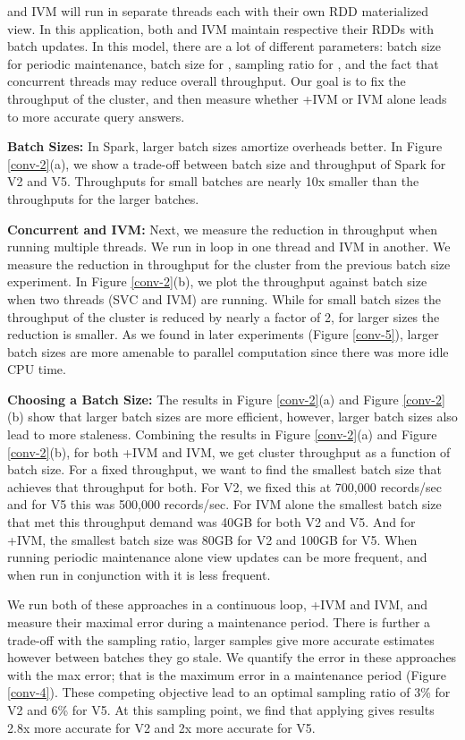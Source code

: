 \svc and IVM will run in separate threads each with their own RDD materialized view.
In this application, both \svc and IVM maintain respective their RDDs with batch updates.
In this model, there are a lot of different parameters: batch size for periodic maintenance, batch size for \svc, sampling ratio for \svc, and the fact that concurrent threads may reduce overall throughput.
Our goal is to fix the throughput of the cluster, and then measure whether \svcnospace+IVM or IVM alone leads to more accurate query answers.

\textbf{Batch Sizes:} In Spark, larger batch sizes amortize overheads better.
In Figure \ref{conv-2}(a), we show a trade-off between batch size and throughput of Spark for V2 and V5.
Throughputs for small batches are nearly 10x smaller than the throughputs for the larger batches. 

\textbf{Concurrent \svc and IVM:} Next, we measure the reduction in throughput when running multiple threads.
We run  in loop in one thread and IVM in another.
We measure the reduction in throughput for the cluster from the previous batch size experiment.
In Figure \ref{conv-2}(b), we plot the throughput against batch size when two threads (SVC and IVM) are running.
While for small batch sizes the throughput of the cluster is reduced by nearly a factor of 2, for larger sizes the reduction is
smaller.
As we found in later experiments (Figure \ref{conv-5}), larger batch sizes are more amenable to parallel computation since there was more idle CPU time.


\textbf{Choosing a Batch Size:}
The results in Figure \ref{conv-2}(a) and Figure \ref{conv-2}(b) show that larger batch sizes are more efficient, however, larger batch sizes also lead to more staleness.
Combining the results in Figure \ref{conv-2}(a) and Figure \ref{conv-2}(b), for both \svcnospace+IVM and IVM, we get cluster throughput as a function of batch size.
For a fixed throughput, we want to find the smallest batch size that achieves that throughput for both.
For V2, we fixed this at 700,000 records/sec and for V5 this was 500,000 records/sec.
For IVM alone the smallest batch size that met this throughput demand was 40GB for both V2 and V5.
And for \svcnospace+IVM, the smallest batch size was 80GB for V2 and 100GB for V5. 
When running periodic maintenance alone view updates can be more frequent, and when run in conjunction with \svc it is less frequent. 

We run both of these approaches in a continuous loop, \svcnospace+IVM and IVM, and measure their maximal error during a maintenance period.
There is further a trade-off with the sampling ratio, larger samples give more accurate estimates however between \svc batches they go stale.
We quantify the error in these approaches with the max error; that is the maximum error in a maintenance period (Figure \ref{conv-4}).
These competing objective lead to an optimal sampling ratio of 3\% for V2 and 6\% for V5.
At this sampling point, we find that applying \svc gives results 2.8x more accurate for V2 and 2x more accurate for V5.

